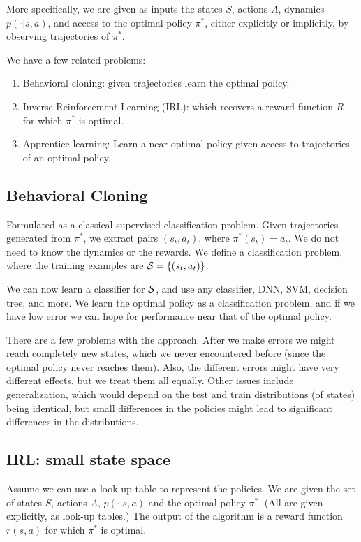More specifically, we are given as inputs the states $S$, actions
$A$, dynamics $p(\cdot|s,a)$, and access to the optimal policy
$\pi^*$, either explicitly or implicitly, by observing trajectories
of $\pi^*$.

We have a few related problems:
\begin{enumerate}
\item
Behavioral cloning: given trajectories learn the optimal policy.
\item
Inverse Reinforcement Learning (IRL): which recovers a reward
function $R$ for which $\pi^*$ is optimal.
\item
Apprentice learning: Learn a near-optimal policy given access to
trajectories of an optimal policy.
\end{enumerate}

\subsection{Behavioral Cloning}

Formulated as a classical supervised classification problem. Given
trajectories generated from $\pi^*$, we extract pairs $(s_t,a_t)$,
where $\pi^*(s_t)=a_t$. We do not need to know the dynamics or the
rewards. We define a classification problem, where the training
examples are ${\cal S}=\{(s_t,a_t)\}$.

We can now learn a classifier for ${\cal S}$, and use any
classifier, DNN, SVM, decision tree, and more. We learn the optimal
policy as a classification problem, and if we have low error we can
hope for performance near that of the optimal policy.

There are a few problems with the approach. After we make errors we
might reach completely new states, which we never encountered before
(since the optimal policy never reaches them). Also, the different
errors might have very different effects, but we treat them all
equally. Other issues include generalization, which would depend on
the test and train distributions (of states) being identical, but
small differences in the policies might lead to significant
differences in the distributions.


\subsection{IRL: small state space}

Assume we can use a look-up table to represent the policies. We are
given the set of states $S$, actions $A$, $p(\cdot|s,a)$ and the
optimal policy $\pi^*$. (All are given explicitly, as look-up
tables.) The output of the algorithm is a reward function $r(s,a)$
for which $\pi^*$ is optimal.


